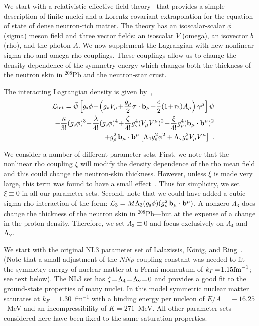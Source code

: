 We start with a relativistic effective field theory~\cite{horst} that
provides a simple description of finite nuclei and a Lorentz covariant
extrapolation for the equation of state of dense neutron-rich matter.
The theory has an isoscalar-scalar $\phi$ (sigma) meson field and
three vector fields: an isoscalar $V$ (omega), an isovector {\bf $b$}
(rho), and the photon $A$. We now supplement the Lagrangian with  
new nonlinear sigma-rho and omega-rho couplings. These couplings 
allow us to change the density dependence of the symmetry energy 
which changes both the thickness of the neutron skin in $^{208}$Pb 
and the neutron-star crust.


The interacting Lagrangian density is given by~\cite{horst},
\begin{eqnarray}
&&
{\cal L}_{\rm int} =
\bar\psi \left[g_{\rm s}\phi   \!-\! 
         \left(g_{\rm v}V_\mu  \!+\!
    \frac{g_{\rho}}{2}{\mbox{\boldmath $\tau$}}\cdot{\bf b}_{\mu} 
                               \!+\!    
    \frac{e}{2}(1\!+\!\tau_{3})A_{\mu}\right)\gamma^{\mu}
         \right]\psi \nonumber \\
                   && - 
    \frac{\kappa}{3!} (g_{\rm s}\phi)^3 \!-\!
    \frac{\lambda}{4!}(g_{\rm s}\phi)^4 \!+\!
    \frac{\zeta}{4!}   g_{\rm v}^4(V_{\mu}V^\mu)^2 \!+\!
    \frac{\xi}{4!}     g_{\rho}^4({\bf b}_{\mu}\cdot {\bf b}^\mu)^2
    \nonumber \\
                   && +
    g_{\rho}^{2}\,{\bf b}_{\mu}\cdot{\bf b}^{\mu}
    \left[\Lambda_{4}g_{\rm s}^{2}\phi^2 +
            \Lambda_{\rm v} g_{\rm v}^2V_{\mu}V^\mu\right] \;.
\end{eqnarray}

We consider a number of different parameter sets. First, we note that
the nonlinear rho coupling $\xi$ will modify the density dependence of
the rho mean field and this could change the neutron-skin
thickness. However, unless $\xi$ is made very large, this term was
found to have a small effect~\cite{horst}. Thus for simplicity, 
we set $\xi\!\equiv\!0$ in all our parameter sets. Second, note
that we could have added a cubic sigma-rho interaction of the form:
${\cal L}_{3}=M \Lambda_{3}(g_{\rm s}\phi) (g_{\rho}^{2}\,{\bf
b}_{\mu}\cdot{\bf b}^{\mu})$. A nonzero $\Lambda_3$ does change the
thickness of the neutron skin in $^{208}$Pb---but at the expense of 
a change in the proton density. Therefore, we set 
$\Lambda_3\!\equiv\!0$ and focus exclusively on $\Lambda_4$ and 
$\Lambda_{\rm v}$.

We start with the original NL3 parameter set of Lalazissis, K\"onig, 
and Ring~\cite{NL3}. (Note that a small adjustment of the $NN\rho$ 
coupling constant was needed to fit the symmetry energy of nuclear
matter at a Fermi momentum of $k_{F}\!=\!1.15 {\rm fm}^{-1}$; see
text below). The NL3 set has 
$\zeta\!=\!\Lambda_4\!=\!\Lambda_{\rm v}\!=\!0$ and provides a good 
fit to the ground-state properties of many nuclei. In this model 
symmetric nuclear matter saturates at $k_F\!=\!1.30$~fm$^{-1}$ with 
a binding energy per nucleon of $E/A\!=\!-16.25$~MeV and an 
incompressibility of $K\!=\!271$~MeV. All other parameter sets 
considered here have been fixed to the same saturation properties.

